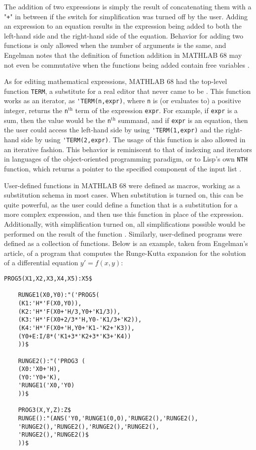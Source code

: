 The addition of two expressions is simply the result of concatenating them with a "\verb|+|" in between if the switch for simplification was turned off by the user. Adding an expression to an equation results in the expression being added to both the left-hand side and the right-hand side of the equation. Behavior for adding two functions is only allowed when the number of arguments is the same, and Engelman notes that the definition of function addition in MATHLAB 68 may not even be commutative when the functions being added contain free variables \parencite{engelman1971legacy}.

As for editing mathematical expressions, MATHLAB 68 had the top-level function \verb|TERM|, a substitute for a real editor that never came to be \parencite{engelman1971legacy}. This function works as an iterator, as \verb|'TERM(n,expr)|, where \verb|n| is (or evaluates to) a positive integer, returns the \verb|n|$^\text{th}$ term of the expression \verb|expr|. For example, if \verb|expr| is a sum, then the value would be the \verb|n|$^\text{th}$ summand, and if \verb|expr| is an equation, then the user could access the left-hand side by using \verb|'TERM(1,expr)| and the right-hand side by using \verb|'TERM(2,expr)|. The usage of this function is also allowed in an iterative fashion. This behavior is reminiscent to that of indexing and iterators in languages of the object-oriented programming paradigm, or to Lisp's own \verb|NTH| function, which returns a pointer to the specified component of the input list \parencite{touretzky2013common}.

User-defined functions in MATHLAB 68 were defined as macros, working as a substitution schema in most cases. When substitution is turned on, this can be quite powerful, as the user could define a function that is a substitution for a more complex expression, and then use this function in place of the expression. Additionally, with simplification turned on, all simplifications possible would be performed on the result of the function \parencite{engelman1971legacy}. Similarly, user-defined programs were defined as a collection of functions. Below is an example, taken from Engelman's article, of a program that computes the Runge-Kutta expansion for the solution of a differential equation $y' = f(x,y)$:

\begin{minipage}{\linewidth}
  \begin{lstlisting}[caption={Example of a user-defined program in MATHLAB 68.},label={lst:example-mathlab-68-program},numbers=none]
    PROG5(X1,X2,X3,X4,X5):X5$
  
    RUNGE1(X0,Y0):"('PROG5(
    (K1:'H*'F(X0,Y0)),
    (K2:'H*'F(X0+'H/3,Y0+'K1/3)),
    (K3:'H*'F(X0+2/3*'H,Y0-'K1/3+'K2)),
    (K4:'H*'F(X0+'H,Y0+'K1-'K2+'K3)),
    (Y0+E:I/8*('K1+3*'K2+3*'K3+'K4))
    ))$
  
    RUNGE2():"('PROG3 (
    (X0:'X0+'H),
    (Y0:'Y0+'K),
    'RUNGE1('X0,'Y0)
    ))$
  
    PROG3(X,Y,Z):Z$
    RUNGE():"(ANS('Y0,'RUNGE1(0,0),'RUNGE2(),'RUNGE2(),
    'RUNGE2(),'RUNGE2(),'RUNGE2(),'RUNGE2(),
    'RUNGE2(),'RUNGE2()$
    ))$
  \end{lstlisting}
\end{minipage}

